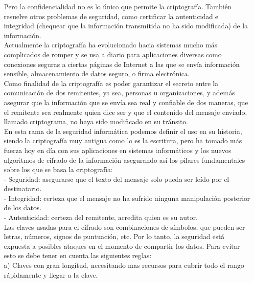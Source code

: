 \documentclass[9pt,24pt,twocolumn]{article}
\begin{document}
{Pero la confidencialidad no es lo único que permite la criptografía. También resuelve otros problemas de seguridad, como certificar la autenticidad e integridad (chequear que la información transmitida no ha sido modificada) de la información.}
\\

{Actualmente la criptografía ha evolucionado hacia sistemas mucho más complicados de romper y se usa a diario para aplicaciones diversas como conexiones seguras a ciertas páginas de Internet a las que se envía información sensible, almacenamiento de datos seguro, o firma electrónica.}
\\

{Como finalidad de la criptografía es poder garantizar el secreto entre la comunicación de dos remitentes, ya sea, personas u organizaciones, y además asegurar que la información que se envía sea real y confiable de dos maneras, que el remitente sea realmente quien dice ser y que el contenido del mensaje enviado, llamado criptograma, no haya sido modificado en su tránsito.}
\\

{En esta rama de la seguridad informática podemos definir el uso en su historia, siendo la criptografía muy antigua como lo es la escritura, pero ha tomado más fuerza hoy en día con sus aplicaciones en sistemas informáticos y los nuevos algoritmos de cifrado de la información asegurando así los pilares fundamentales sobre los que se basa la criptografía:}
\\

{-	Seguridad: asegurarse que el texto del mensaje solo pueda ser leído por el destinatario.}
\\

{-	Integridad: certeza que el mensaje no ha sufrido ninguna manipulación posterior de los datos.}
\\

{-	Autenticidad: certeza del remitente, acredita quien es su autor.}
\\

{Las claves usadas para el cifrado son combinaciones de símbolos, que pueden ser letras, números, signos de puntuación, etc. Por lo tanto, la seguridad está expuesta a posibles ataques en el momento de compartir los datos. Para evitar esto se debe tener en cuenta las siguientes reglas:}
\\

{a) Claves con gran longitud, necesitando mas recursos para cubrir todo el rango rápidamente y llegar a la clave.}
\\
\end{document}
